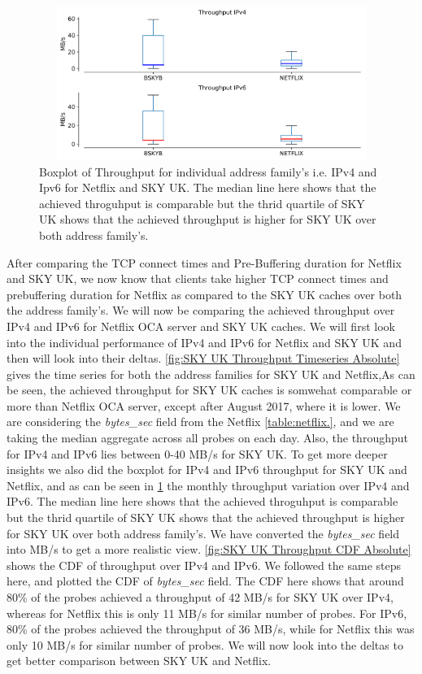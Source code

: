 \begin{figure}[!ht]
	\centering
	\includegraphics[keepaspectratio, height=5cm, width=15cm]{figures/cache/bskyb/netflix-throughput-boxplot-asn-5607-separate.pdf}
	\caption[SKY UK Throughput Boxplot Absolute]{Boxplot of Throughput for individual address family's i.e. IPv4 and Ipv6 for Netflix and SKY UK. The median line here shows that the achieved throguhput is
	comparable but the thrid quartile of SKY UK shows that the achieved throughput is higher for SKY UK over both address family's.}
	\label{fig:SKY UK Throughput Boxplot Absolute}
\end{figure}

After comparing the TCP connect times and Pre-Buffering duration for Netflix and SKY UK, we now know that clients take higher TCP connect times and prebuffering duration
for Netflix as compared to the SKY UK caches over both the address family's. We will now be comparing the achieved throughput over IPv4 and IPv6 for Netflix OCA server and SKY UK caches.
We will first look into the individual performance of IPv4 and IPv6 for Netflix and SKY UK and then will look into their deltas. \cref{fig:SKY UK Throughput Timeseries Absolute} gives the time series for
both the address families for SKY UK and Netflix,As can be seen, the achieved throughput for SKY UK caches is somwehat comparable or more than Netflix OCA server, except after August 2017, where it is lower.
We are considering the \textit{bytes\_sec} field from the Netflix \cref{table:netflix.}, and we are taking the median aggregate across
all probes on each day. Also, the throughput for IPv4 and IPv6 lies between 0-40 MB/s for SKY UK. To get more deeper insights
we also did the boxplot for IPv4 and IPv6 throughput for SKY UK and Netflix, and as can be seen in \cref{fig:SKY UK Throughput Boxplot Absolute} the monthly
throughput variation over IPv4 and IPv6. The median line here shows that the achieved throguhput is comparable but the thrid quartile of SKY UK shows that the achieved throughput is higher for SKY UK over both address family's. We have 
converted the \textit{bytes\_sec} field into MB/s to get a more realistic view. \cref{fig:SKY UK Throughput CDF Absolute} shows the CDF of
throughput over IPv4 and IPv6. We followed the same steps here, and plotted the CDF of \textit{bytes\_sec} field. The CDF here shows that around 80\% of the probes achieved a throughput of 42 MB/s for SKY UK over IPv4, whereas for Netflix this is only 11 MB/s
for similar number of probes. For IPv6, 80\% of the probes achieved the throughput of 36 MB/s, while for Netflix this was only 10 MB/s for similar number of probes. 
We will now look into the deltas to get better comparison between SKY UK and Netflix. 

